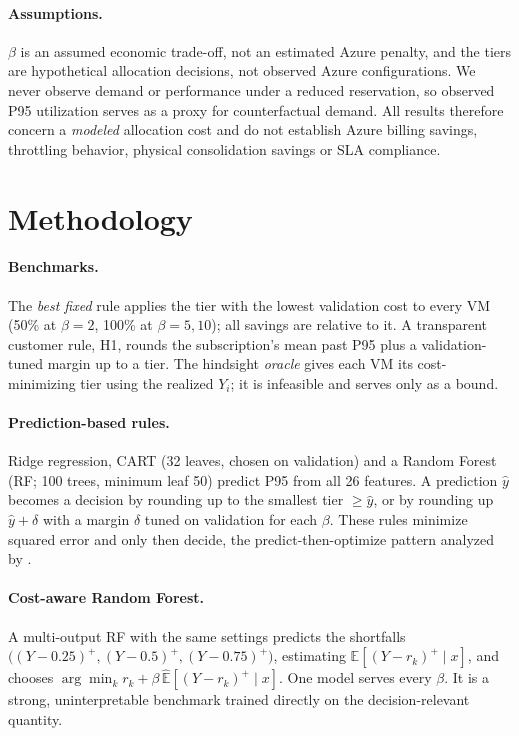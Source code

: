 \documentclass[10pt]{article}
\newcommand{\Ex}{\mathbb{E}}
\begin{document}
\paragraph{Assumptions.} $\beta$ is an assumed economic trade-off, not an estimated Azure penalty, and the tiers are hypothetical allocation decisions, not observed Azure configurations. We never observe demand or performance under a reduced reservation, so observed P95 utilization serves as a proxy for counterfactual demand. All results therefore concern a \emph{modeled} allocation cost and do not establish Azure billing savings, throttling behavior, physical consolidation savings or SLA compliance.

\section{Methodology}
\label{sec:methods}

\paragraph{Benchmarks.} The \emph{best fixed} rule applies the tier with the lowest validation cost to every VM (50\% at $\beta=2$, 100\% at $\beta=5,10$); all savings are relative to it. A transparent customer rule, H1, rounds the subscription's mean past P95 plus a validation-tuned margin up to a tier. The hindsight \emph{oracle} gives each VM its cost-minimizing tier using the realized $Y_i$; it is infeasible and serves only as a bound.

\paragraph{Prediction-based rules.} Ridge regression, CART (32 leaves, chosen on validation) and a Random Forest (RF; 100 trees, minimum leaf 50) \citep{breiman2001rf} predict P95 from all 26 features. A prediction $\hat y$ becomes a decision by rounding up to the smallest tier $\ge\hat y$, or by rounding up $\hat y+\delta$ with a margin $\delta$ tuned on validation for each $\beta$. These rules minimize squared error and only then decide, the predict-then-optimize pattern analyzed by \citet{elmachtoub2022spo}.

\paragraph{Cost-aware Random Forest.} A multi-output RF with the same settings predicts the shortfalls $\big((Y-0.25)^+,(Y-0.5)^+,(Y-0.75)^+\big)$, estimating $\Ex[(Y-r_k)^+\mid x]$, and chooses $\arg\min_k r_k+\beta\,\widehat{\Ex}[(Y-r_k)^+\mid x]$. One model serves every $\beta$. It is a strong, uninterpretable benchmark trained directly on the decision-relevant quantity.
\end{document}
